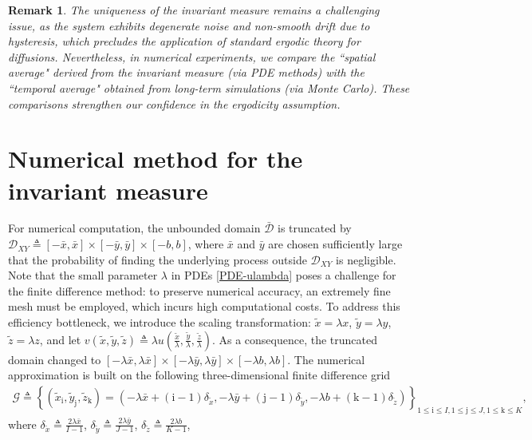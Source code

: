 \documentclass[12pt]{article}
\numberwithin{equation}{section}
\newtheorem{remark}[theorem]{Remark}
\newcommand{\cG}{\mathcal{G}}
\newcommand{\ri}{\mathrm{i}}
\newcommand{\rj}{\mathrm{j}}
\newcommand{\rk}{\mathrm{k}}
\begin{document}
\begin{remark}
	The uniqueness of the invariant measure remains a challenging issue, 
	as the system exhibits degenerate noise and non-smooth drift due to hysteresis, 
	which precludes the application of standard ergodic theory for diffusions. 
	Nevertheless, in numerical experiments, 
	we compare the ``spatial average" derived from the invariant measure (via PDE methods) with 
	the ``temporal average" obtained from long-term simulations (via Monte Carlo). 
	These comparisons strengthen our confidence in the ergodicity assumption. 
\end{remark}

\section{Numerical method for the invariant measure}\label{sec:num-method} 
For numerical computation, 
the unbounded domain $\bar{\mathcal{D}}$ is  truncated by
$\mathcal{D}_{XY} \triangleq [-\bar{x}, \bar{x}] \times [-\bar{y}, \bar{y}] \times [-b, b]$, 
where $\bar{x}$ 
and $\bar{y}$ are chosen sufficiently large that the probability of finding the 
underlying process outside $\mathcal{D}_{XY}$ is negligible. 
Note that the small parameter $\lambda$ in PDEs \eqref{PDE-ulambda} poses a challenge 
for the finite difference method: 
to preserve numerical accuracy, 
an extremely fine mesh must be employed, 
which incurs high computational costs. 
To address this efficiency bottleneck, we introduce the scaling transformation:
$\tilde{x} = \lambda x$, $\tilde{y} = \lambda y$, $\tilde{z} = \lambda z$, 
and let $v(\tilde{x},\tilde{y},\tilde{z}) \triangleq 
\lambda u(\frac{\tilde{x}}{\lambda},\frac{\tilde{y}}{\lambda},\frac{\tilde{z}}{\lambda})$. 
As a consequence, the truncated domain changed to 
$[-\lambda \bar{x}, \lambda \bar{x}] \times [-\lambda \bar{y}, \lambda \bar{y}] 
\times [-\lambda b, \lambda b]$. 
The numerical approximation is built on the following three-dimensional finite difference grid
\begin{align*}
	\cG \triangleq \left\{(\tilde{x}_{\ri},\tilde{y}_{\rj},\tilde{z}_{\rk}) 
	= (-\lambda\bar{x} + (\ri-1) \delta_{\tilde{x}}, -\lambda\bar{y} + (\rj-1) \delta_{\tilde{y}}, 
	-\lambda b + (\rk-1) \delta_{\tilde{z}})\right\}_{1 \le \ri \le I, 1 \le \rj \le J, 1 \le \rk \le K},
\end{align*}
where $\delta_{\tilde{x}} \triangleq \frac{2\lambda\bar{x}}{I-1}$, 
$\delta_{\tilde{y}} \triangleq \frac{2\lambda\bar{y}}{J-1}$, 
$\delta_{\tilde{z}} \triangleq \frac{2\lambda b}{K-1}$, 
\end{document}
